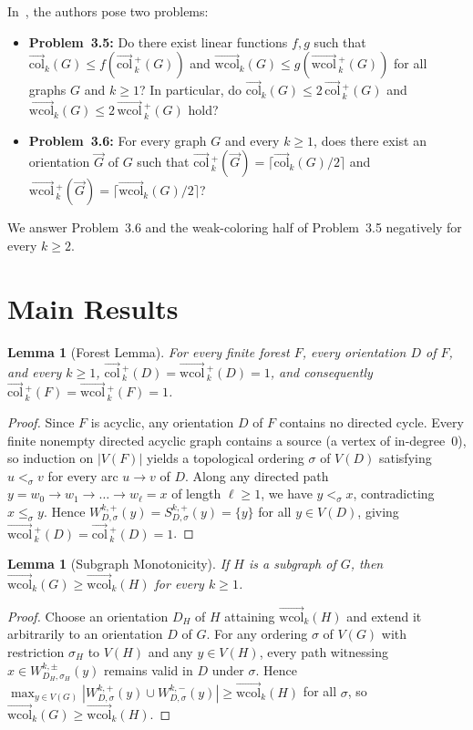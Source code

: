 \documentclass[11pt]{article}
\newtheorem{lemma}[theorem]{Lemma}
\newcommand{\wcol}{\overrightarrow{\mathrm{wcol}}}
\newcommand{\dcol}{\overrightarrow{\mathrm{col}}}
\newcommand{\wcolp}{\overrightarrow{\mathrm{wcol}}\,^{+}}
\newcommand{\dcolp}{\overrightarrow{\mathrm{col}}\,^{+}}
\begin{document}
In~\cite{LNY2026}, the authors pose two problems:
\begin{itemize}
  \item \textbf{Problem~3.5:} Do there exist linear functions $f, g$ such that $\dcol_k(G) \le f(\dcolp_k(G))$ and $\wcol_k(G) \le g(\wcolp_k(G))$ for all graphs $G$ and $k \ge 1$? In particular, do $\dcol_k(G) \le 2\,\dcolp_k(G)$ and $\wcol_k(G) \le 2\,\wcolp_k(G)$ hold?
  \item \textbf{Problem~3.6:} For every graph $G$ and every $k \ge 1$, does there exist an orientation $\vec{G}$ of $G$ such that $\dcolp_k(\vec{G}) = \lceil \dcol_k(G)/2 \rceil$ and $\wcolp_k(\vec{G}) = \lceil \wcol_k(G)/2 \rceil$?
\end{itemize}

We answer Problem~3.6 and the weak-coloring half of Problem~3.5 negatively for every $k \ge 2$.

\section{Main Results}

\begin{lemma}[Forest Lemma]\label{lem:forest}
For every finite forest $F$, every orientation $D$ of $F$, and every $k \ge 1$, $\dcolp_k(D) = \wcolp_k(D) = 1$, and consequently $\dcolp_k(F) = \wcolp_k(F) = 1$.
\end{lemma}

\begin{proof}
Since $F$ is acyclic, any orientation $D$ of $F$ contains no directed cycle. Every finite nonempty directed acyclic graph contains a source (a vertex of in-degree~$0$), so induction on $|V(F)|$ yields a topological ordering $\sigma$ of $V(D)$ satisfying $u <_\sigma v$ for every arc $u \to v$ of $D$. Along any directed path $y = w_0 \to w_1 \to \dots \to w_\ell = x$ of length $\ell \ge 1$, we have $y <_\sigma x$, contradicting $x \le_\sigma y$. Hence $W^{k, +}_{D, \sigma}(y) = S^{k, +}_{D, \sigma}(y) = \{y\}$ for all $y \in V(D)$, giving $\wcolp_k(D) = \dcolp_k(D) = 1$.
\end{proof}

\begin{lemma}[Subgraph Monotonicity]\label{lem:mono}
If $H$ is a subgraph of $G$, then $\wcol_k(G) \ge \wcol_k(H)$ for every $k \ge 1$.
\end{lemma}

\begin{proof}
Choose an orientation $D_H$ of $H$ attaining $\wcol_k(H)$ and extend it arbitrarily to an orientation $D$ of $G$. For any ordering $\sigma$ of $V(G)$ with restriction $\sigma_H$ to $V(H)$ and any $y \in V(H)$, every path witnessing $x \in W^{k, \pm}_{D_H, \sigma_H}(y)$ remains valid in $D$ under $\sigma$. Hence $\max_{y \in V(G)} |W^{k, +}_{D, \sigma}(y) \cup W^{k, -}_{D, \sigma}(y)| \ge \wcol_k(H)$ for all $\sigma$, so $\wcol_k(G) \ge \wcol_k(H)$.
\end{proof}
\end{document}
